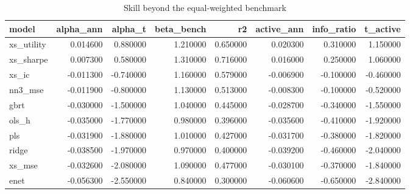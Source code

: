 \begin{table}
\caption{Skill beyond the equal-weighted benchmark}
\label{tab:t4_vs_benchmark}
\begin{tabular}{lrrrrrrr}
\toprule
model & alpha\_ann & alpha\_t & beta\_bench & r2 & active\_ann & info\_ratio & t\_active \\
\midrule
xs\_utility & 0.014600 & 0.880000 & 1.210000 & 0.650000 & 0.020300 & 0.310000 & 1.150000 \\
xs\_sharpe & 0.007300 & 0.580000 & 1.310000 & 0.716000 & 0.016000 & 0.250000 & 1.060000 \\
xs\_ic & -0.011300 & -0.740000 & 1.160000 & 0.579000 & -0.006900 & -0.100000 & -0.460000 \\
nn3\_mse & -0.011900 & -0.800000 & 1.130000 & 0.513000 & -0.008300 & -0.100000 & -0.520000 \\
gbrt & -0.030000 & -1.500000 & 1.040000 & 0.445000 & -0.028700 & -0.340000 & -1.550000 \\
ols\_h & -0.035000 & -1.770000 & 0.980000 & 0.396000 & -0.035600 & -0.410000 & -1.920000 \\
pls & -0.031900 & -1.880000 & 1.010000 & 0.427000 & -0.031700 & -0.380000 & -1.820000 \\
ridge & -0.038500 & -1.970000 & 0.970000 & 0.400000 & -0.039200 & -0.460000 & -2.040000 \\
xs\_mse & -0.032600 & -2.080000 & 1.090000 & 0.477000 & -0.030100 & -0.370000 & -1.840000 \\
enet & -0.056300 & -2.550000 & 0.840000 & 0.300000 & -0.060600 & -0.650000 & -2.840000 \\
\bottomrule
\end{tabular}
\end{table}

